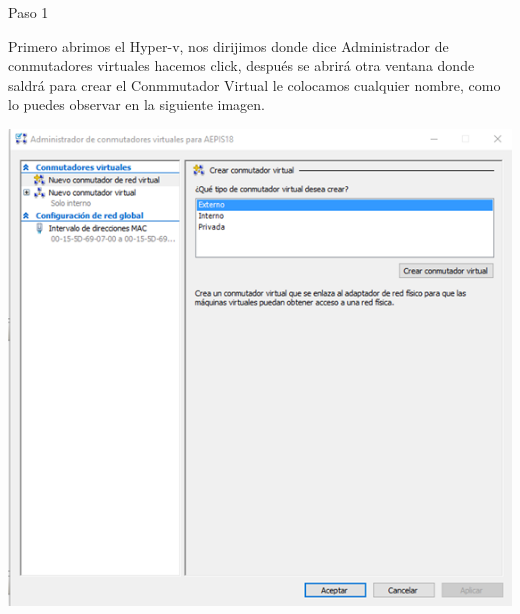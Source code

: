 \begin{itemize}
	\begin{center}
	    Paso 1
	\end{center}
	

	    Primero abrimos el Hyper-v, nos dirijimos donde dice Administrador de conmutadores virtuales hacemos click, después se abrirá otra ventana donde saldrá para crear el Conmmutador Virtual le colocamos cualquier nombre, como lo puedes observar en la siguiente imagen.
		\begin{center}
		\includegraphics[width=15cm]{./Imagenes/imagen1} 
		\end{center}
	

	\end{itemize} 
	

